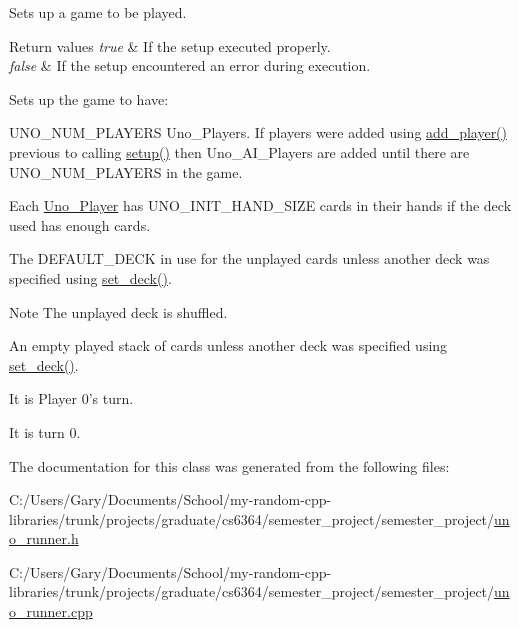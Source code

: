 \-Sets up a game to be played. 


\begin{DoxyRetVals}{\-Return values}
{\em true} & \-If the setup executed properly. \\
\hline
{\em false} & \-If the setup encountered an error during execution.\\
\hline
\end{DoxyRetVals}
\-Sets up the game to have\-: \begin{DoxyItemize}
\item \-U\-N\-O\-\_\-\-N\-U\-M\-\_\-\-P\-L\-A\-Y\-E\-R\-S \-Uno\-\_\-\-Players. \-If players were added using \hyperlink{class_uno___runner_a982f614c5afa8faa57aedc3116f3d237}{add\-\_\-player()} previous to calling \hyperlink{class_uno___runner_ae015517f7d4493ddbaaeacd98be0b9b8}{setup()} then \-Uno\-\_\-\-A\-I\-\_\-\-Players are added until there are \-U\-N\-O\-\_\-\-N\-U\-M\-\_\-\-P\-L\-A\-Y\-E\-R\-S in the game. \item \-Each \hyperlink{class_uno___player}{\-Uno\-\_\-\-Player} has \-U\-N\-O\-\_\-\-I\-N\-I\-T\-\_\-\-H\-A\-N\-D\-\_\-\-S\-I\-Z\-E cards in their hands if the deck used has enough cards. \item \-The \-D\-E\-F\-A\-U\-L\-T\-\_\-\-D\-E\-C\-K in use for the unplayed cards unless another deck was specified using \hyperlink{class_uno___runner_a2ca7c819e3fc8774853cc5a49333eeb9}{set\-\_\-deck()}. \begin{DoxyNote}{\-Note}
\-The unplayed deck is shuffled. 
\end{DoxyNote}
\item \-An empty played stack of cards unless another deck was specified using \hyperlink{class_uno___runner_a2ca7c819e3fc8774853cc5a49333eeb9}{set\-\_\-deck()}. \item \-It is \-Player 0's turn. \item \-It is turn 0. \end{DoxyItemize}


\-The documentation for this class was generated from the following files\-:\begin{DoxyCompactItemize}
\item 
\-C\-:/\-Users/\-Gary/\-Documents/\-School/my-\/random-\/cpp-\/libraries/trunk/projects/graduate/cs6364/semester\-\_\-project/semester\-\_\-project/\hyperlink{uno__runner_8h}{uno\-\_\-runner.\-h}\item 
\-C\-:/\-Users/\-Gary/\-Documents/\-School/my-\/random-\/cpp-\/libraries/trunk/projects/graduate/cs6364/semester\-\_\-project/semester\-\_\-project/\hyperlink{uno__runner_8cpp}{uno\-\_\-runner.\-cpp}\end{DoxyCompactItemize}
